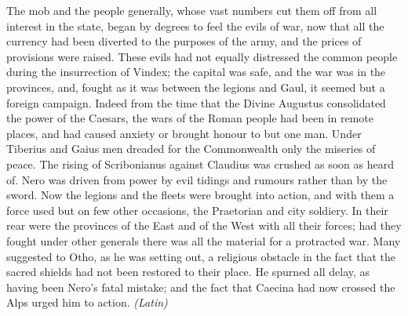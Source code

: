 
The mob and the people generally, whose vast numbers cut them off from all interest in the state, began by degrees to feel the evils of war, now that all the currency had been diverted to the purposes of the army, and the prices of provisions were raised. These evils had not equally distressed the common people during the insurrection of Vindex; the capital was safe, and the war was in the provinces, and, fought as it was between the legions and Gaul, it seemed but a foreign campaign. Indeed from the time that the Divine Augustus consolidated the power of the Caesars, the wars of the Roman people had been in remote places, and had caused anxiety or brought honour to but one man. Under Tiberius and Gaius men dreaded for the Commonwealth only the miseries of peace. The rising of Scribonianus against Claudius was crushed as soon as heard of. Nero was driven from power by evil tidings and rumours rather than by the sword. Now the legions and the fleets were brought into action, and with them a force used but on few other occasions, the Praetorian and city soldiery. In their rear were the provinces of the East and of the West with all their forces; had they fought under other generals there was all the material for a protracted war. Many suggested to Otho, as he was setting out, a religious obstacle in the fact that the sacred shields had not been restored to their place. He spurned all delay, as having been Nero's fatal mistake; and the fact that Caecina had now crossed the Alps urged him to action. \emph{(Latin)}


